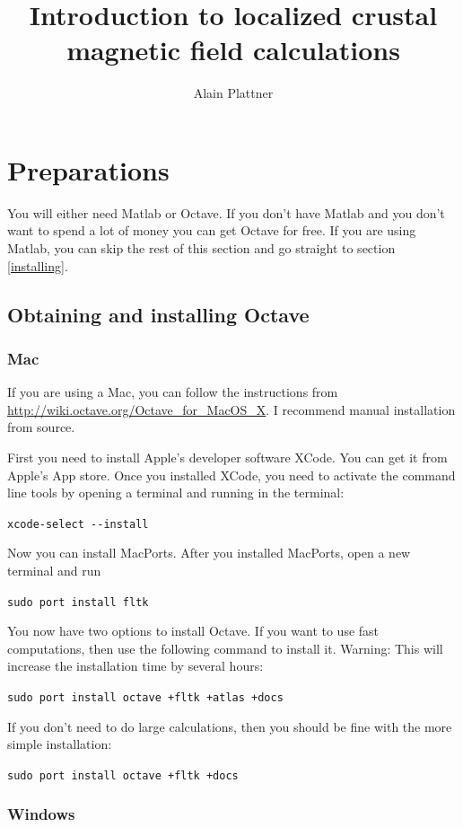 \documentclass[11pt]{article}
\title{Introduction to localized crustal magnetic field calculations}
\author{Alain Plattner}
\begin{document}
\maketitle

\section{Preparations}

You will either need Matlab or Octave. If you don't have Matlab and you don't want to spend a lot of money you can get Octave for free. If you are using Matlab, you can skip the rest of this section and go straight to section \ref{installing}.

\subsection{Obtaining and installing Octave}

\subsubsection{Mac}

If you are using a Mac, you can follow the instructions from \url{http://wiki.octave.org/Octave_for_MacOS_X}. I recommend manual installation from source. 

First you need to install Apple's developer software XCode. You can get it from Apple's App store. Once you installed XCode, you need to activate the command line tools by opening a terminal and running in the terminal:

\qquad \verb!xcode-select --install!

Now you can install MacPorts. After you installed MacPorts, open a new terminal and run 

\qquad \verb!sudo port install fltk!

You now have two options to install Octave. If you want to use fast computations, then use the following command to install it. Warning: This will increase the installation time by several hours: 

\qquad \verb!sudo port install octave +fltk +atlas +docs!

If you don't need to do large calculations, then you should be fine with the more simple installation:

\qquad \verb!sudo port install octave +fltk +docs!

\subsubsection{Windows}
\end{document}
